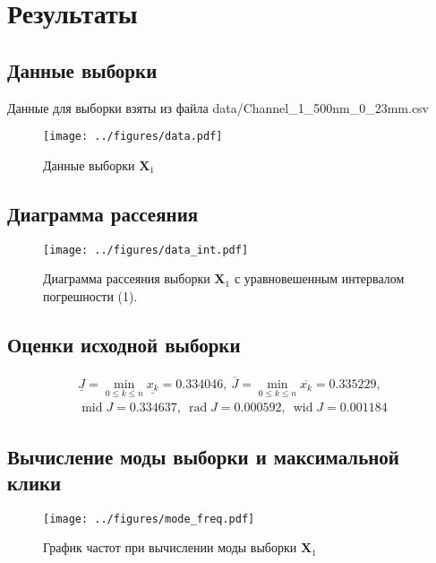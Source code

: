 \documentclass[12pt]{article}
\DeclareMathOperator{\rad}{rad}
\DeclareMathOperator{\wid}{wid}
\DeclareMathOperator{\midd}{mid}
\begin{document}
	\section{Результаты}
	
	\subsection{Данные выборки}
	
	Данные для выборки взяты из файла data/Channel\_1\_500nm\_0\_23mm.csv
	\begin{figure}[H]
		\centering\texttt{[image: ../figures/data.pdf]}
		\caption{Данные выборки $\mathbf{X}_1$}
	\end{figure}

	\subsection{Диаграмма рассеяния}
	
	\begin{figure}[H]
		\centering\texttt{[image: ../figures/data\_int.pdf]}
		\caption{Диаграмма рассеяния выборки $\mathbf{X}_1$ с уравновешенным интервалом погрешности (1).}
	\end{figure}
	
	\subsection{Оценки исходной выборки}
	
	\begin{equation*}
		\begin{gathered}
			\underline{J} = \min\limits_{0\leq k\leq n}\underline{x_k} = 0.334046,\ 
			\overline{J} = \min\limits_{0\leq k\leq n}\overline{x_k} = 0.335229,\\
			\midd J = 0.334637,\ \rad J = 0.000592,\ \wid J = 0.001184
		\end{gathered}
	\end{equation*}

	\subsection{Вычисление моды выборки и максимальной клики}
	
	\begin{figure}[H]
		\centering\texttt{[image: ../figures/mode\_freq.pdf]}
		\caption{График частот при вычислении моды выборки $\mathbf{X}_1$}
	\end{figure}
	
\end{document}
